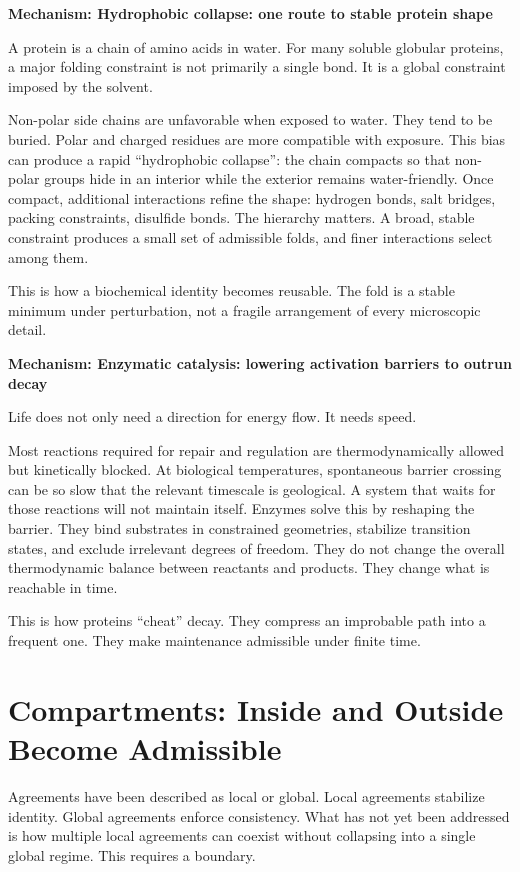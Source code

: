 \documentclass[11pt,twoside,openright]{book}
\newenvironment{mechanismbox}[1]
  {\begin{framed}\noindent\textbf{Mechanism: #1}\par\medskip}
  {\end{framed}}
\begin{document}
\begin{mechanismbox}{Hydrophobic collapse: one route to stable protein shape}
A protein is a chain of amino acids in water.
For many soluble globular proteins, a major folding constraint is not primarily a single bond.
It is a global constraint imposed by the solvent.

Non-polar side chains are unfavorable when exposed to water. They tend to be buried. Polar and charged residues are more compatible with exposure. This bias can produce a rapid ``hydrophobic collapse'': the chain compacts so that non-polar groups hide in an interior while the exterior remains water-friendly. Once compact, additional interactions refine the shape: hydrogen bonds, salt bridges, packing constraints, disulfide bonds. The hierarchy matters. A broad, stable constraint produces a small set of admissible folds, and finer interactions select among them.

This is how a biochemical identity becomes reusable.
The fold is a stable minimum under perturbation, not a fragile arrangement of every microscopic detail.
\end{mechanismbox}
\begin{mechanismbox}{Enzymatic catalysis: lowering activation barriers to outrun decay}
Life does not only need a direction for energy flow.
It needs speed.

Most reactions required for repair and regulation are thermodynamically allowed but kinetically blocked. At biological temperatures, spontaneous barrier crossing can be so slow that the relevant timescale is geological. A system that waits for those reactions will not maintain itself. Enzymes solve this by reshaping the barrier. They bind substrates in constrained geometries, stabilize transition states, and exclude irrelevant degrees of freedom. They do not change the overall thermodynamic balance between reactants and products. They change what is reachable in time.

This is how proteins ``cheat'' decay.
They compress an improbable path into a frequent one.
They make maintenance admissible under finite time.
\end{mechanismbox}
\chapter{Compartments: Inside and Outside Become Admissible}

Agreements have been described as local or global. Local agreements stabilize identity. Global agreements enforce consistency. What has not yet been addressed is how multiple local agreements can coexist without collapsing into a single global regime. This requires a boundary.
\end{document}
